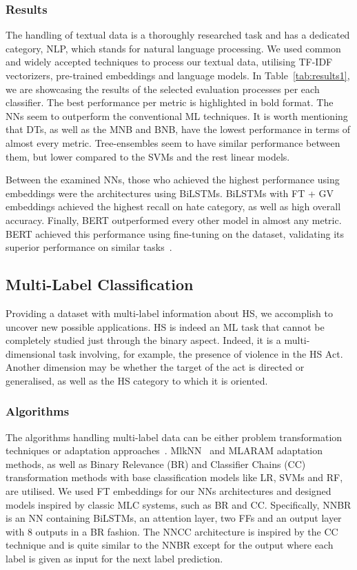 \documentclass[sigconf]{acmart}
\begin{document}
\subsubsection{Results}
The handling of textual data is a thoroughly researched task and has a dedicated category, NLP, which stands for natural language processing. We used common and widely accepted techniques to process our textual data, utilising TF-IDF vectorizers, pre-trained embeddings and language models. In Table~\ref{tab:results1}, we are showcasing the results of the selected evaluation processes per each classifier. The best performance per metric is highlighted in bold format. The NNs seem to outperform the conventional ML techniques. It is worth mentioning that DTs, as well as the MNB and BNB, have the lowest performance in terms of almost every metric. Tree-ensembles seem to have similar performance between them, but lower compared to the SVMs and the rest linear models.

Between the examined NNs, those who achieved the highest performance using embeddings were the architectures using BiLSTMs. BiLSTMs with FT + GV embeddings achieved the highest recall on hate category, as well as high overall accuracy. Finally, BERT outperformed every other model in almost any metric. BERT achieved this performance using fine-tuning on the dataset, validating its superior performance on similar tasks~\cite{DBLP:conf/fire/RanasingheZH19}.

\subsection{Multi-Label Classification}
Providing a dataset with multi-label information about HS, we accomplish to uncover new possible applications. HS is indeed an ML task that cannot be completely studied just through the binary aspect. Indeed, it is a multi-dimensional task involving, for example, the presence of violence in the HS Act. Another dimension may be whether the target of the act is directed or generalised, as well as the HS category to which it is oriented.

\subsubsection{Algorithms}
The algorithms handling multi-label data can be either problem transformation techniques or adaptation approaches~\cite{tsoum}. MlkNN~\cite{zhang2007ml} and MLARAM \cite{MLARAM} adaptation methods, as well as Binary Relevance (BR) and Classifier Chains (CC)~\cite{read2009classifier} transformation methods with base classification models like LR, SVMs and RF, are utilised. We used FT embeddings for our NNs architectures and designed models inspired by classic MLC systems, such as BR and CC. Specifically, NNBR is an NN containing BiLSTMs, an attention layer, two FFs and an output layer with 8 outputs in a BR fashion. The NNCC architecture is inspired by the CC technique and is quite similar to the NNBR except for the output where each label is given as input for the next label prediction.
\end{document}
